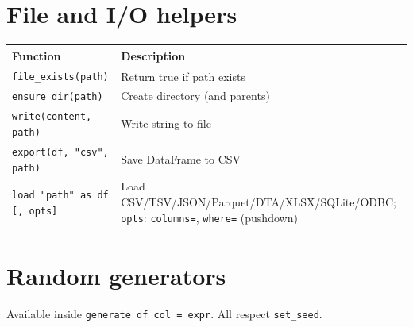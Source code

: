 \section{File and I/O helpers}

\begin{center}
\begin{tabular}{ll}
\toprule
\textbf{Function} & \textbf{Description} \\
\midrule
\texttt{file\_exists(path)}       & Return true if path exists \\
\texttt{ensure\_dir(path)}        & Create directory (and parents) \\
\texttt{write(content, path)}     & Write string to file \\
\texttt{export(df, "csv", path)}   & Save DataFrame to CSV \\
\texttt{load "path" as df [, opts]} & Load CSV/TSV/JSON/Parquet/DTA/XLSX/SQLite/ODBC; \texttt{opts}: \texttt{columns=}, \texttt{where=} (pushdown) \\
\bottomrule
\end{tabular}
\end{center}

\section{Random generators}

Available inside \lstinline{generate df col = expr}. All respect \lstinline{set_seed}.

